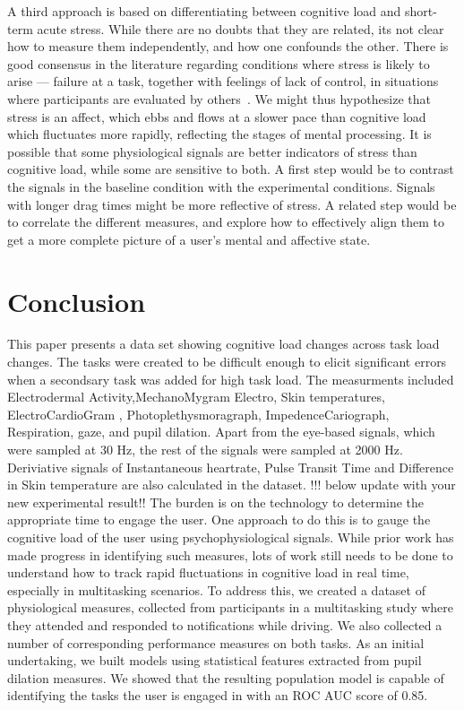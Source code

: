 A third approach is based on differentiating between cognitive load and short-term acute stress. While there are no doubts that they are related, its not clear how to measure them independently, and how one confounds the other. There is good consensus in the literature regarding conditions where stress is likely to arise --- failure at a task, together with feelings of lack of control, in situations where participants are evaluated by others~\cite{conway2013}. We might thus hypothesize that stress is an affect, which ebbs and flows at a slower pace than cognitive load which fluctuates more rapidly, reflecting the stages of mental processing. It is possible that some physiological signals are better indicators of stress than cognitive load, while some are sensitive to both. A first step would be to contrast the signals in the baseline condition with the experimental conditions. Signals with longer drag times might be more reflective of stress. A related step would be to correlate the different measures, and explore how to effectively align them to get a more complete picture of a user's mental and affective state. 

\section{Conclusion}
This paper presents a data set showing cognitive load changes across task load changes.  The tasks were created to be difficult enough to elicit significant errors when a secondsary task was added for high task load.   The measurments included  Electrodermal Activity,MechanoMygram Electro, Skin temperatures, ElectroCardioGram , Photoplethysmoragraph, ImpedenceCariograph,  Respiration, gaze, and pupil dilation. Apart from the eye-based signals, which were sampled at 30 Hz, the rest of the signals were sampled at 2000 Hz. 
Deriviative signals of Instantaneous heartrate, Pulse Transit Time and Difference in Skin temperature are also calculated in the dataset.
!!! below update with your new experimental result!!
The burden is on the technology to determine the appropriate time to engage the user. One approach to do this is to gauge the cognitive load of the user using psychophysiological signals. While prior work has made progress in identifying such measures, lots of work still needs to be done to understand how to track rapid fluctuations in cognitive load in real time, especially in multitasking scenarios. To address this, we created a dataset of physiological measures, collected from participants in a multitasking study where they attended and responded to notifications while driving. We also collected a number of corresponding performance measures on both tasks. As an initial undertaking, we built models using statistical features extracted from pupil dilation measures. We showed that the resulting population model is capable of identifying the tasks the user is engaged in with an ROC AUC score of 0.85.

